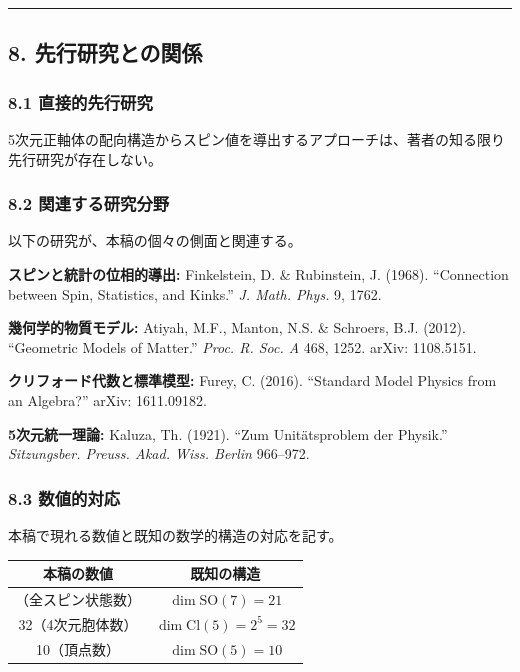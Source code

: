 \documentclass[a4paper,11pt]{ltjsarticle}
\newcounter{none}
\begin{document}
\begin{center}\rule{0.5\linewidth}{0.5pt}\end{center}

\subsection*{8. 先行研究との関係}

\subsubsection*{8.1 直接的先行研究}

5次元正軸体の配向構造からスピン値を導出するアプローチは、著者の知る限り先行研究が存在しない。

\subsubsection*{8.2 関連する研究分野}

以下の研究が、本稿の個々の側面と関連する。

\textbf{スピンと統計の位相的導出:} Finkelstein, D. \& Rubinstein, J.
(1968). ``Connection between Spin, Statistics, and Kinks.'' \emph{J.
Math. Phys.} 9, 1762.

\textbf{幾何学的物質モデル:} Atiyah, M.F., Manton, N.S. \& Schroers,
B.J. (2012). ``Geometric Models of Matter.'' \emph{Proc. R. Soc. A} 468,
1252. arXiv: 1108.5151.

\textbf{クリフォード代数と標準模型:} Furey, C. (2016). ``Standard
Model Physics from an Algebra?'' arXiv: 1611.09182.

\textbf{5次元統一理論:} Kaluza, Th. (1921). ``Zum Unitätsproblem der
Physik.'' \emph{Sitzungsber. Preuss. Akad. Wiss. Berlin} 966--972.

\subsubsection*{8.3 数値的対応}

本稿で現れる数値と既知の数学的構造の対応を記す。

{\def\LTcaptype{none}
\begin{longtable}[]{@{}cc@{}}
\toprule
本稿の数値 & 既知の構造 \\
\midrule
\endhead
\bottomrule
\endlastfoot
21（全スピン状態数） & $\dim \mathrm{SO}(7) = 21$ \\
32（4次元胞体数） & $\dim \mathrm{Cl}(5) = 2^5 = 32$ \\
10（頂点数） & $\dim \mathrm{SO}(5) = 10$ \\
\end{longtable}
}
\end{document}
